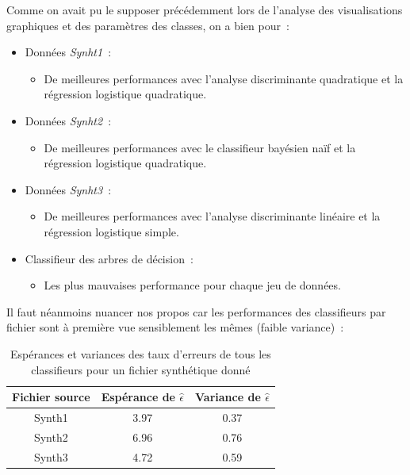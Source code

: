\documentclass[a4paper,10pt]{report}
\begin{document}
Comme on avait pu le supposer précédemment lors de l'analyse des visualisations graphiques et des paramètres des classes, on a bien pour~:
\begin{itemize}
	\item Données \textit{Synht1}~:
	\begin{itemize}
		\item De meilleures performances avec l'analyse discriminante quadratique et la régression logistique quadratique.
	\end{itemize}
	\item Données \textit{Synht2}~:
	\begin{itemize}
		\item De meilleures performances avec le classifieur bayésien naïf et la régression logistique quadratique.
	\end{itemize}
	\item Données \textit{Synht3}~:
	\begin{itemize}
		\item De meilleures performances avec l'analyse discriminante linéaire et la régression logistique simple.
	\end{itemize}
	\item Classifieur des arbres de décision~:
	\begin{itemize}
		\item Les plus mauvaises performance pour chaque jeu de données.
	\end{itemize}
\end{itemize}




Il faut néanmoins nuancer nos propos car les performances des classifieurs par fichier sont à première vue sensiblement les mêmes (faible variance)~:
\begin{table}[H]
	\centering
	\captionsetup{justification=centering, margin=4cm}
	\begin{tabular}{c|c|c}
		Fichier source & Espérance de $\hat{\epsilon}$ & Variance de $\hat{\epsilon}$  \\ 
		\hline
		Synth1 & 3.97 & 0.37 \\ 
		Synth2 & 6.96 & 0.76  \\ 
		Synth3 & 4.72 & 0.59  \\ 
	\end{tabular}
	\caption{\small Espérances et variances des taux d'erreurs de tous les classifieurs pour un fichier synthétique donné}
	\label{table:2-1-erreur-data-synth-mean-var}
\end{table}
\end{document}
